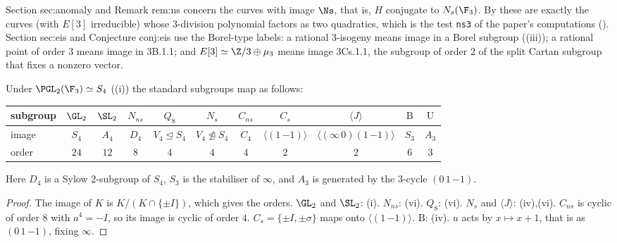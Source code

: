 \begin{paperlink}
Section sec:anomaly and Remark rem:ns concern the curves with image $\Ns$, that is, $H$ conjugate to $N_s(\F_3)$. By  these are exactly
the curves (with $E[3]$ irreducible) whose $3$-division polynomial factors as two quadratics, which is the test \texttt{ns3} of the paper's computations
(). Section sec:eis and Conjecture conj:eis use the Borel-type labels: a rational $3$-isogeny means image in a Borel subgroup
((iii)); a rational point of order $3$ means image in 3B.1.1; and $E[3]\simeq\Z/3\oplus\mu_3$ means image 3Cs.1.1, the subgroup of order $2$ of the split
Cartan subgroup that fixes a nonzero vector.
\end{paperlink}

\begin{proposition}[Images in $S_4$]\label{prop:groups:imagesS4}
Under $\PGL_2(\F_3)\simeq S_4$ ((i)) the standard subgroups map as follows:
\begin{center}
\small
\begin{tabular}{lcccccccccc}
\toprule
subgroup & $\GL_2$ & $\SL_2$ & $N_{ns}$ & $Q_8$ & $N_s$ & $C_{ns}$ & $C_s$ & $\langle J\rangle$ & $\mathrm B$ & $\mathrm U$\\
\midrule
image & $S_4$ & $A_4$ & $D_4$ & $V_4\trianglelefteq S_4$ & $V_4\not\trianglelefteq S_4$ & $C_4$ & $\langle(1\,{-1})\rangle$ & $\langle(\infty\,0)(1\,{-1})\rangle$ & $S_3$ & $A_3$\\
order & $24$ & $12$ & $8$ & $4$ & $4$ & $4$ & $2$ & $2$ & $6$ & $3$\\
\bottomrule
\end{tabular}
\end{center}
Here $D_4$ is a Sylow $2$-subgroup of $S_4$, $S_3$ is the stabiliser of $\infty$, and $A_3$ is generated by the $3$-cycle $(0\,1\,{-1})$.
\end{proposition}

\begin{proof}
The image of $K$ is $K/(K\cap\{\pm I\})$, which gives the orders. $\GL_2$ and $\SL_2$: (i). $N_{ns}$: (vi). $Q_8$:
(vi). $N_s$ and $\langle J\rangle$: (iv),(vi). $C_{ns}$ is cyclic of order $8$ with $a^4=-I$, so its image is cyclic of order $4$. $C_s=\{\pm I,\pm\sigma\}$
maps onto $\langle(1\,{-1})\rangle$. $\mathrm B$: (iv). $u$ acts by $x\mapsto x+1$, that is as $(0\,1\,{-1})$, fixing $\infty$.
\end{proof}

